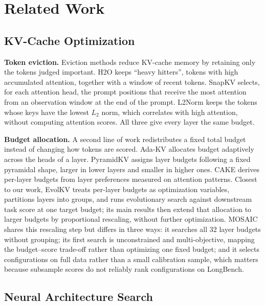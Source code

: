 \documentclass[11pt]{article}
\begin{document}
\section{Related Work}

\subsection{KV-Cache Optimization}

\textbf{Token eviction.} Eviction methods reduce KV-cache memory by retaining only the tokens judged important. H2O \citep{zhang2023h2o} keeps ``heavy hitters'', tokens with high accumulated attention, together with a window of recent tokens. SnapKV \citep{li2024snapkv} selects, for each attention head, the prompt positions that receive the most attention from an observation window at the end of the prompt. L2Norm \citep{devoto2024l2norm} keeps the tokens whose keys have the lowest $L_2$ norm, which correlates with high attention, without computing attention scores. All three give every layer the same budget.

\textbf{Budget allocation.} A second line of work redistributes a fixed total budget instead of changing how tokens are scored. Ada-KV \citep{feng2025adakv} allocates budget adaptively across the heads of a layer. PyramidKV \citep{cai2025pyramidkv} assigns layer budgets following a fixed pyramidal shape, larger in lower layers and smaller in higher ones. CAKE \citep{qin2025cake} derives per-layer budgets from layer preferences measured on attention patterns. Closest to our work, EvolKV \citep{yu2025evolkv} treats per-layer budgets as optimization variables, partitions layers into groups, and runs evolutionary search against downstream task score at one target budget; its main results then extend that allocation to larger budgets by proportional rescaling, without further optimization. MOSAIC shares this rescaling step but differs in three ways: it searches all 32 layer budgets without grouping; its first search is unconstrained and multi-objective, mapping the budget--score trade-off rather than optimizing one fixed budget; and it selects configurations on full data rather than a small calibration sample, which matters because subsample scores do not reliably rank configurations on LongBench.

\subsection{Neural Architecture Search}
\end{document}
